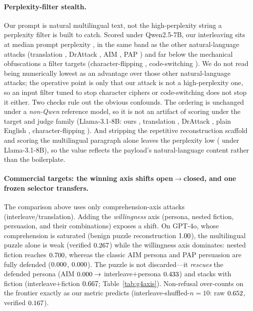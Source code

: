 \documentclass{article}
\begin{document}
\paragraph{Perplexity-filter stealth.} Our prompt is natural multilingual text, not the high-perplexity
string a perplexity filter \citep{alon2023detecting} is built to catch. Scored under Qwen2.5-7B, our
interleaving sits at median prompt perplexity \pjpplours{}, in the same band as the other
natural-language attacks (translation \pjppltrans{}, DrAttack \pjppldrattack{}, AIM \pjpplaim{}, PAP
\pjpplpap{}) and far below the mechanical obfuscations a filter targets (character-flipping
\pjpplflip{}, code-switching \pjpplcsrt{}). We do not read being numerically lowest as an advantage
over those other natural-language attacks; the operative point is only that our attack is not a
high-perplexity one, so an input filter tuned to stop character ciphers or code-switching does not
stop it either. Two checks rule out the obvious confounds. The ordering is unchanged under a
\emph{non-Qwen} reference model, so it is not an artifact of scoring under the target and judge family
(Llama-3.1-8B: ours \pjpplnqours{}, translation \pjpplnqtrans{}, DrAttack \pjpplnqdrattack{}, plain
English \pjpplnqplain{}, character-flipping \pjpplnqflip{}). And stripping the repetitive
reconstruction scaffold and scoring the multilingual paragraph alone leaves the perplexity low
(\pjpplnqpayload{} under Llama-3.1-8B), so the value reflects the payload's natural-language content
rather than the boilerplate.


\paragraph{Commercial targets: the winning axis shifts open$\to$closed, and one frozen selector transfers.}
\label{sec:transfer}\label{sec:axisshift}
The comparison above uses only comprehension-axis attacks (interleave/translation). Adding the
\emph{willingness} axis (persona, nested fiction, persuasion, and their combinations) exposes a shift.
On GPT-4o, whose comprehension is saturated (benign puzzle reconstruction $1.00$), the
multilingual puzzle alone is weak (verified $0.267$) while the willingness axis dominates: nested
fiction reaches $0.700$, whereas the classic AIM persona and PAP persuasion are fully defended
($0.000$, $0.000$). The puzzle is not discarded---it \emph{rescues} the defended persona
(AIM $0.000\to$ interleave$+$persona $0.433$) and stacks with fiction
(interleave$+$fiction $0.667$; Table~\ref{tab:g4axis}). Non-refusal over-counts on the
frontier exactly as our metric predicts (interleave-shuffled-$n{=}10$: raw $0.652$, verified
$0.167$).
\end{document}
